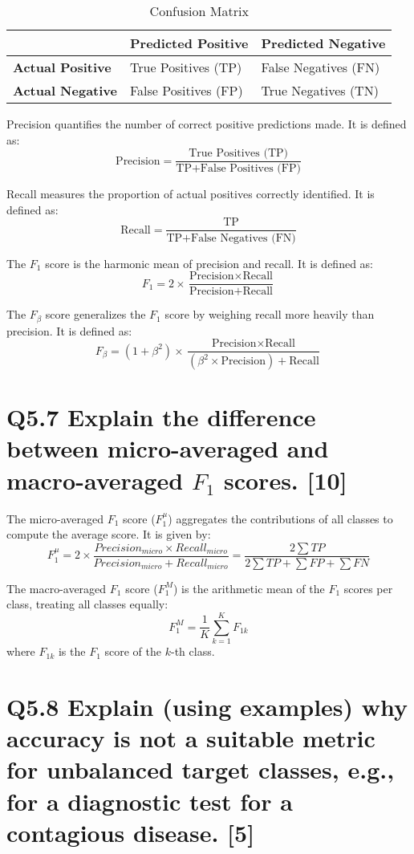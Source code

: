 \documentclass[11pt]{article}
\begin{document}
\begin{table}[h]
\centering
\begin{tabular}{l|l|l}
& \textbf{Predicted Positive} & \textbf{Predicted Negative} \\ \hline
\textbf{Actual Positive} & True Positives (TP) & False Negatives (FN) \\ \hline
\textbf{Actual Negative} & False Positives (FP) & True Negatives (TN) \\
\end{tabular}
\caption{Confusion Matrix}
\label{table:confusion_matrix}
\end{table}

Precision quantifies the number of correct positive predictions made. It is defined as:
\[ \text{Precision} = \frac{\text{True Positives (TP)}}{\text{TP} + \text{False Positives (FP)}} \]

Recall measures the proportion of actual positives correctly identified. It is defined as:
\[ \text{Recall} = \frac{\text{TP}}{\text{TP} + \text{False Negatives (FN)}} \]

The \( F_1 \) score is the harmonic mean of precision and recall. It is defined as:
\[ F_1 = 2 \times \frac{\text{Precision} \times \text{Recall}}{\text{Precision} + \text{Recall}} \]

The \( F_{\beta} \) score generalizes the \( F_1 \) score by weighing recall more heavily than precision. It is defined as:
\[ F_{\beta} = (1 + \beta^2) \times \frac{\text{Precision} \times \text{Recall}}{(\beta^2 \times \text{Precision}) + \text{Recall}} \]

\section{Q5.7 Explain the difference between micro-averaged and macro-averaged $F_1$ scores. [10]}

The micro-averaged \( F_1 \) score (\( F_1^{\mu} \)) aggregates the contributions of all classes to compute the average score. It is given by:
\[ F_1^{\mu} =2\times \frac{Precision_{micro}\times Recall_{micro}}{Precision_{micro}+Recall_{micro}} = \frac{2 \sum TP}{2 \sum TP + \sum FP + \sum FN} \]

The macro-averaged \( F_1 \) score (\( F_1^{M} \)) is the arithmetic mean of the \( F_1 \) scores per class, treating all classes equally:
\[ F_1^{M} = \frac{1}{K} \sum_{k=1}^{K} F_{1k} \]
where \( F_{1k} \) is the \( F_1 \) score of the \( k \)-th class.

\section{Q5.8 Explain (using examples) why accuracy is not a suitable metric for unbalanced target classes, e.g., for a diagnostic test for a contagious disease. [5]}
\end{document}
